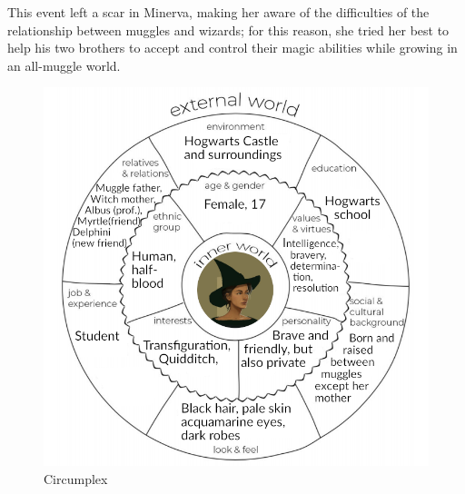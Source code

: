 This event left a scar in Minerva, making her aware of the difficulties of the relationship between muggles and wizards; for this reason, she tried her best to help his two brothers to accept and control their magic abilities while growing in an all-muggle world.

\begin{figure}[H]
\includegraphics[max width=\textwidth]{../Pictures/Characters/Circumplexes/Minerva_circumplex.png} 
\captionsetup{labelformat=empty}
\caption{Circumplex}
\end{figure}

